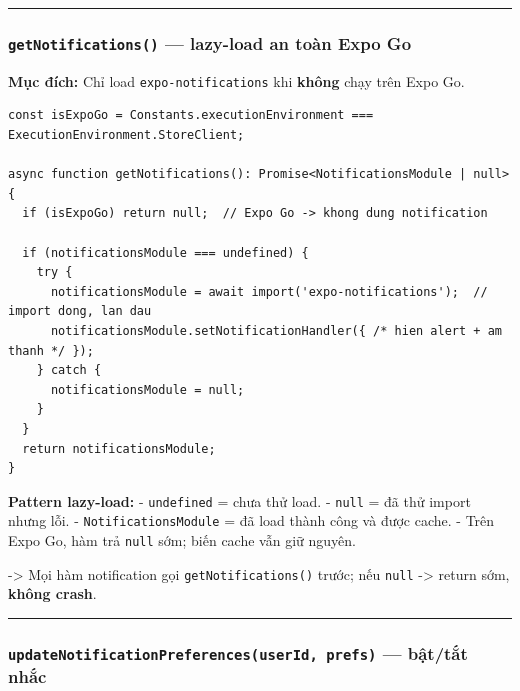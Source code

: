 \documentclass[12pt,a4paper]{article}
\begin{document}
\begin{center}\rule{0.5\linewidth}{0.5pt}\end{center}

\subsubsection{\texorpdfstring{\texttt{getNotifications()} --- lazy-load
an toàn Expo
Go}{getNotifications() --- lazy-load an toàn Expo Go}}\label{getnotifications-lazy-load-an-touxe0n-expo-go}

\textbf{Mục đích:} Chỉ load \texttt{expo-notifications} khi
\textbf{không} chạy trên Expo Go.

\begin{verbatim}
const isExpoGo = Constants.executionEnvironment === ExecutionEnvironment.StoreClient;

async function getNotifications(): Promise<NotificationsModule | null> {
  if (isExpoGo) return null;  // Expo Go -> khong dung notification

  if (notificationsModule === undefined) {
    try {
      notificationsModule = await import('expo-notifications');  // import dong, lan dau
      notificationsModule.setNotificationHandler({ /* hien alert + am thanh */ });
    } catch {
      notificationsModule = null;
    }
  }
  return notificationsModule;
}

\end{verbatim}

\textbf{Pattern lazy-load:} - \texttt{undefined} = chưa thử load. -
\texttt{null} = đã thử import nhưng lỗi. - \texttt{NotificationsModule}
= đã load thành công và được cache. - Trên Expo Go, hàm trả
\texttt{null} sớm; biến cache vẫn giữ nguyên.

-\textgreater{} Mọi hàm notification gọi \texttt{getNotifications()}
trước; nếu \texttt{null} -\textgreater{} return sớm, \textbf{không
crash}.

\begin{center}\rule{0.5\linewidth}{0.5pt}\end{center}

\subsubsection{\texorpdfstring{\texttt{updateNotificationPreferences(userId,\ prefs)}
--- bật/tắt
nhắc}{updateNotificationPreferences(userId, prefs) --- bật/tắt nhắc}}\label{updatenotificationpreferencesuserid-prefs-bux1eadttux1eaft-nhux1eafc}
\end{document}
